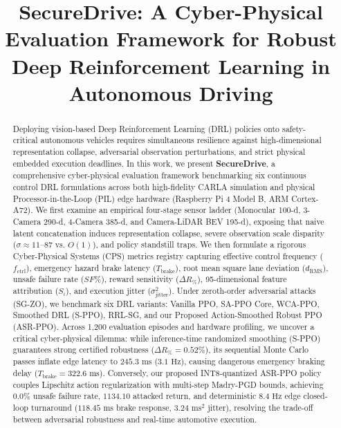 \documentclass[conference]{IEEEtran}
\begin{document}
\title{SecureDrive: A Cyber-Physical Evaluation Framework for Robust Deep Reinforcement Learning in Autonomous Driving}

\author{
}

\maketitle

\begin{abstract}
Deploying vision-based Deep Reinforcement Learning (DRL) policies onto safety-critical autonomous vehicles requires simultaneous resilience against high-dimensional representation collapse, adversarial observation perturbations, and strict physical embedded execution deadlines. In this work, we present \textbf{SecureDrive}, a comprehensive cyber-physical evaluation framework benchmarking six continuous control DRL formulations across both high-fidelity CARLA simulation and physical Processor-in-the-Loop (PIL) edge hardware (Raspberry Pi 4 Model B, ARM Cortex-A72). We first examine an empirical four-stage sensor ladder (Monocular 100-d, 3-Camera 290-d, 4-Camera 385-d, and Camera-LiDAR BEV 195-d), exposing that naive latent concatenation induces representation collapse, severe observation scale disparity ($\sigma \approx 11\text{--}87$ vs. $O(1)$), and policy standstill traps. We then formulate a rigorous Cyber-Physical Systems (CPS) metrics registry capturing effective control frequency ($f_{\text{ctrl}}$), emergency hazard brake latency ($T_{\text{brake}}$), root mean square lane deviation ($d_{\text{RMS}}$), unsafe failure rate ($SF\%$), reward sensitivity ($\Delta R_\%$), 95-dimensional feature attribution ($S_i$), and execution jitter ($\sigma^2_{\text{jitter}}$). Under zeroth-order adversarial attacks (SG-ZO), we benchmark six DRL variants: Vanilla PPO, SA-PPO Core, WCA-PPO, Smoothed DRL (S-PPO), RRL-SG, and our Proposed Action-Smoothed Robust PPO (ASR-PPO). Across 1,200 evaluation episodes and hardware profiling, we uncover a critical cyber-physical dilemma: while inference-time randomized smoothing (S-PPO) guarantees strong certified robustness ($\Delta R_\% = 0.52\%$), its sequential Monte Carlo passes inflate edge latency to $245.3\text{ ms}$ ($3.1\text{ Hz}$), causing dangerous emergency braking delay ($T_{\text{brake}} = 322.6\text{ ms}$). Conversely, our proposed INT8-quantized ASR-PPO policy couples Lipschitz action regularization with multi-step Madry-PGD bounds, achieving $0.0\%$ unsafe failure rate, $1134.10$ attacked return, and deterministic $8.4\text{ Hz}$ edge closed-loop turnaround ($118.45\text{ ms}$ brake response, $3.24\text{ ms}^2$ jitter), resolving the trade-off between adversarial robustness and real-time automotive execution.
\end{abstract}
\end{document}
